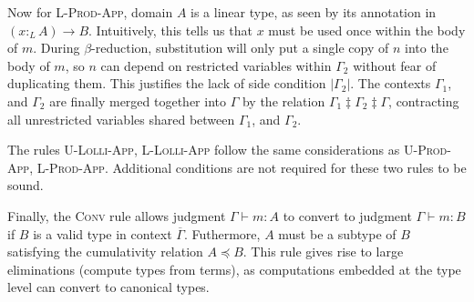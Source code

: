 \documentclass[sigplan,screen,review,authordraft]{acmart}
\theoremstyle{definition}
\newcommand{\rname}[1]{\textsc{\footnotesize #1}}
\newcommand{\pure}[1]{|#1|}
\newcommand{\ltype}{:_{\scriptscriptstyle L}}
\newcommand{\mrg}[3]{#1\ddagger#2\ddagger#3}
\begin{document}
  Now for \rname{L-Prod-App}, domain $A$ is a linear type, as seen by its annotation in $(x \ltype A) \rightarrow B$. Intuitively, this tells us that $x$ must be used once within the body of $m$. During $\beta$-reduction, substitution will only put a single copy of $n$ into the body of $m$, so $n$ can depend on restricted variables within $\Gamma_2$ without fear of duplicating them. This justifies the lack of side condition $\pure{\Gamma_2}$. The contexts $\Gamma_1$, and $\Gamma_2$ are finally merged together into $\Gamma$ by the relation $\mrg{\Gamma_1}{\Gamma_2}{\Gamma}$, contracting all unrestricted variables shared between $\Gamma_1$, and $\Gamma_2$.

  The rules \rname{U-Lolli-App}, \rname{L-Lolli-App} follow the same considerations as \rname{U-Prod-App}, \rname{L-Prod-App}. Additional conditions are not required for these two rules to be sound.

  Finally, the \rname{Conv} rule allows judgment $\Gamma \vdash m : A$ to convert to judgment $\Gamma \vdash m : B$ if $B$ is a valid type in context $\overline{\Gamma}$. Futhermore, $A$ must be a subtype of $B$ satisfying the cumulativity relation $A \preceq B$. This rule gives rise to large eliminations (compute types from terms), as computations embedded at the type level can convert to canonical types.
\end{document}

